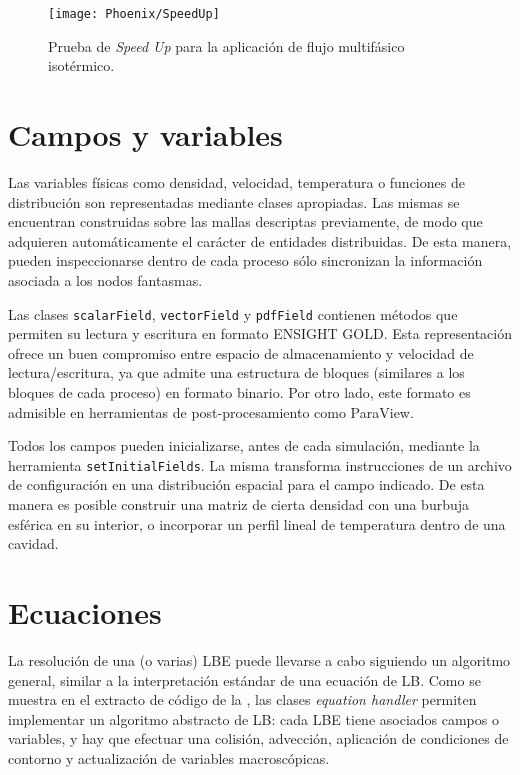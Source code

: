 \begin{figure}[ht]
	\centering
	\texttt{[image: Phoenix/SpeedUp]}
	\caption{Prueba de \emph{Speed Up} para la aplicaci\'on de flujo multif\'asico isot\'ermico.}
	\label{fig:speedup_cpu}
\end{figure}




\section{Campos y variables}

Las variables f\'isicas como densidad, velocidad, temperatura o funciones de distribuci\'on son representadas mediante clases apropiadas. Las mismas se encuentran construidas sobre las mallas descriptas previamente, de modo que adquieren autom\'aticamente el car\'acter de entidades distribuidas. De esta manera, pueden inspeccionarse dentro de cada proceso s\'olo sincronizan la informaci\'on asociada a los nodos fantasmas.

Las clases \texttt{scalarField}, \texttt{vectorField} y \texttt{pdfField} contienen m\'etodos que permiten su lectura y escritura en formato ENSIGHT GOLD. Esta representaci\'on ofrece un buen compromiso entre espacio de almacenamiento y velocidad de lectura/escritura, ya que admite una estructura de bloques (similares a los bloques de cada proceso) en formato binario. Por otro lado, este formato es admisible en herramientas de post-procesamiento como ParaView.

Todos los campos pueden inicializarse, antes de cada simulaci\'on, mediante la herramienta \texttt{setInitialFields}. La misma transforma instrucciones de un archivo de configuraci\'on en una distribuci\'on espacial para el campo indicado. De esta manera es posible construir una matriz de cierta densidad con una burbuja esf\'erica en su interior, o incorporar un perfil lineal de temperatura dentro de una cavidad.



\section{Ecuaciones}

La resoluci\'on de una (o varias) LBE puede llevarse a cabo siguiendo un algoritmo general, similar a la interpretaci\'on est\'andar de una ecuaci\'on de LB. Como se muestra en el extracto de c\'odigo de la , las clases \emph{equation handler} permiten implementar un algoritmo abstracto de LB: cada LBE tiene asociados campos o variables, y hay que efectuar una colisi\'on, advecci\'on, aplicaci\'on de condiciones de contorno y actualizaci\'on de variables macrosc\'opicas.

